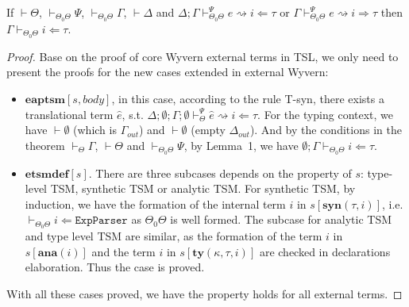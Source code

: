 \documentclass{sig-alternate}
\begin{document}
\begin{theorem}
If $\vdash\Theta$, $\vdash_{\Theta_0\Theta}\Psi$, $\vdash_{\Theta_0\Theta}\Gamma$, $\vdash\Delta$ and $\Delta;\Gamma\vdash_{\Theta_0\Theta}^{\Psi} e\rightsquigarrow i\Leftarrow\tau$ or $\Gamma\vdash_{\Theta_0\Theta}^{\Psi} e\rightsquigarrow i\Rightarrow\tau$ then $\Gamma\vdash_{\Theta_0\Theta} i\Leftarrow\tau$.
\end{theorem}
\begin{proof}
Base on the proof of core Wyvern external terms in TSL, we only need to present the proofs for the new cases extended in external Wyvern:
\begin{itemize}
\item $\mathbf{eaptsm}[s,body]$, in this case, according to the rule T-syn, there exists a translational term $\hat{e}$, s.t. $\Delta;\emptyset;\Gamma;\emptyset\vdash_{\Theta}^{\Psi}\hat{e}\rightsquigarrow i\Leftarrow \tau$. For the typing context, we have $\vdash\emptyset$ (which is $\Gamma_{out}$) and $\vdash\emptyset$ (empty $\Delta_{out}$). And by the conditions in the theorem $\vdash_{\Theta}\Gamma$, $\vdash\Theta$ and $\vdash_{\Theta_0\Theta}\Psi$, by Lemma~1, we have $\emptyset;\Gamma\vdash_{\Theta_0\Theta}i\Leftarrow\tau$. 
\item $\mathbf{etsmdef}[s]$. There are three subcases depends on the property of $s$: type-level TSM, synthetic TSM or analytic TSM. For synthetic TSM, by induction, we have the formation of the internal term $i$ in $s[\mathbf{syn}(\tau,i)]$, i.e. $\vdash_{\Theta_0\Theta}i\Leftarrow \mathtt{ExpParser}$ as $\Theta_0\Theta$ is well formed. The subcase for analytic TSM and type level TSM are similar, as the formation of the term $i$ in $s[\mathbf{ana}(i)]$ and the term $i$ in $s[\mathbf{ty}(\kappa,\tau,i)]$ are checked in declarations elaboration. Thus the case is proved.
\end{itemize}
With all these cases proved, we have the property holds for all external terms.
\end{proof}
\end{document}
